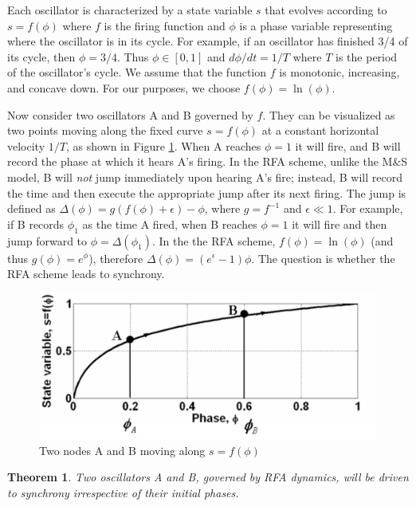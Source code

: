 \documentclass{sig-alternate}
\begin{document}
{Each oscillator is characterized by a state variable $s$ that evolves
according to $s=f(\phi)$ where $f$ is the firing function and $\phi$
is a phase variable representing where the oscillator is in its
cycle. For example, if an oscillator has finished 3/4 of its cycle,
then $\phi=3/4$. Thus $\phi\in[0,1]$ and $d\phi/dt=1/T$ where $T$ is
the period of the oscillator's cycle. We assume that the function $f$
is monotonic, increasing, and concave down. For our purposes, we
choose $f(\phi)=\ln(\phi)$.

Now consider two oscillators A and B governed by $f$. They can be
visualized as two points moving along the fixed curve $s=f(\phi)$ at a
constant horizontal velocity $1/T$, as shown in Figure
\ref{fig:theory2}. When A reaches $\phi=1$ it will fire, and B will
record the phase at which it hears A's firing. In the RFA scheme,
unlike the M\&S model, B will \emph{not} jump immediately upon hearing
A's fire; instead, B will record the time and then execute the
appropriate jump after its next firing. The jump is defined as
$\Delta(\phi)=g(f(\phi)+\epsilon)-\phi$, where $g=f^{-1}$ and
$\epsilon \ll 1$. For example, if B records $\phi_1$ as the time A
fired, when B reaches $\phi=1$ it will fire and then jump forward to
$\phi=\Delta(\phi_1)$. In the the RFA scheme, $f(\phi) = \ln(\phi)$
(and thus $g(\phi)=e^{\phi}$), therefore
$\Delta(\phi)=(e^{\epsilon}-1)\phi$. The question is whether the RFA
scheme leads to synchrony.

\begin{figure}[t]
\begin{center}
\includegraphics[width=1.0\hsize]{./figures/theory-2oscillators.pdf}
\end{center}
\caption{Two nodes A and B moving along $s=f(\phi)$}
\label{fig:theory2}
\end{figure}

\newtheorem{theorem}{Theorem}
\begin{theorem}
Two oscillators A and B, governed by RFA dynamics, will be driven to
synchrony irrespective of their initial phases.
\end{theorem}

}
\end{document}
